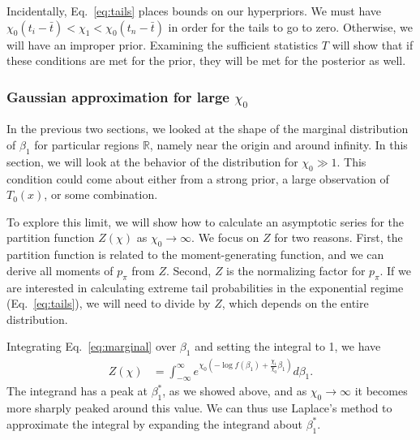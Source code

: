 \documentclass[12pt, letterpaper]{article}
\begin{document}
Incidentally, Eq.~\ref{eq:tails} places bounds on our hyperpriors.
We must have $\chi_0(t_i - \bar{t}) < \chi_1 < \chi_0(t_n - \bar{t})$ in order for the tails to go to zero.
Otherwise, we will have an improper prior.
Examining the sufficient statistics $T$ will show that if these conditions are met for the prior, they will be met for the posterior as well.

\subsubsection{Gaussian approximation for large $\chi_0$}

In the previous two sections, we looked at the shape of the marginal distribution of $\beta_1$ for particular regions $\mathbb{R}$, namely near the origin and around infinity.
In this section, we will look at the behavior of the distribution for $\chi_0 \gg 1$.
This condition could come about either from a strong prior, a large observation of $T_0(x)$, or some combination.

To explore this limit, we will show how to calculate an asymptotic series for the partition function $Z(\chi)$ as $\chi_0 \to \infty$.
We focus on $Z$ for two reasons.
First, the partition function is related to the moment-generating function, and we can derive all moments of $p_\pi$ from $Z$.
Second, $Z$ is the normalizing factor for $p_\pi$.
If we are interested in calculating extreme tail probabilities in the exponential regime (Eq.~\ref{eq:tails}), we will need to divide by $Z$, which depends on the entire distribution.

Integrating Eq.~\ref{eq:marginal} over $\beta_1$ and setting the integral to 1, we have
\begin{align}
    Z(\chi) &= \int_{-\infty}^{\infty} e^{\chi_0(- \log f(\beta_1) + \frac{\chi_1}{\chi_0} \beta_1)} d\beta_1.
\end{align}
The integrand has a peak at $\beta_1^*$, as we showed above, and as $\chi_0 \to \infty$ it becomes more sharply peaked around this value.
We can thus use Laplace's method to approximate the integral by expanding the integrand about $\beta_1^*$.
\end{document}
